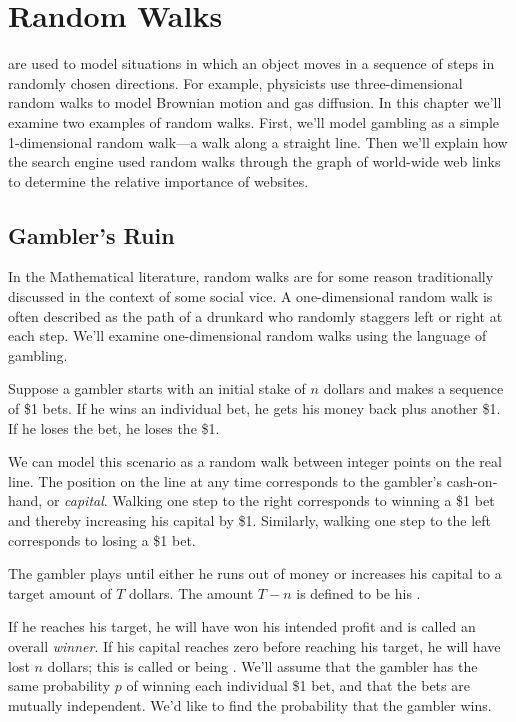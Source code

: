 \newcommand{\PRnk}{\operatorname{Rank}}

\chapter{Random Walks}\label{ran_process_chap}

 are used to model situations in which an object
moves in a sequence of steps in randomly chosen directions.  For
example, physicists use three-dimensional random walks to model
Brownian motion and gas diffusion.  In this chapter we'll examine two
examples of random walks.  First, we'll model gambling as a simple
1-dimensional random walk---a walk along a straight line.  Then we'll
explain how the  search engine used random walks through
the graph of world-wide web links to determine the relative importance
of websites.

\section{Gambler's Ruin}

\begin{editingnotes}
In the Mathematical literature, random walks are for some reason
traditionally discussed in the context of some social vice.  A
one-dimensional random walk is often described as the path of a drunkard
who randomly staggers left or right at each step.  We'll examine
one-dimensional random walks using the language of gambling.
\end{editingnotes}

Suppose a gambler starts with an initial stake of $n$ dollars and
makes a sequence of \$1 bets.  If he wins an individual bet, he gets
his money back plus another \$1.  If he loses the bet, he loses the
\$1.

We can model this scenario as a random walk between integer points on
the real line.  The position on the line at any time corresponds to
the gambler's cash-on-hand, or \emph{capital}.  Walking one step to the
right corresponds to winning a \$1 bet and thereby increasing his
capital by \$1.  Similarly, walking one step to the left corresponds
to losing a \$1 bet.

The gambler plays until either he runs out of money or increases
his capital to a target amount of $T$ dollars.  The amount $T-n$ is
defined to be his .

If he reaches his target, he will have won his intended profit and is
called an overall \emph{winner}.  If his capital reaches zero before
reaching his target, he will have lost $n$ dollars; this is called
 or being .  We'll assume that the
gambler has the same probability $p$ of winning each individual \$1
bet, and that the bets are mutually independent.  We'd like to find
the probability that the gambler wins.

